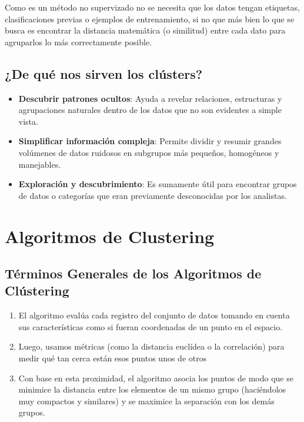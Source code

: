 Como es un método no supervizado no se necesita que los datos tengan
etiquetas, clasificaciones previas o ejemplos de entrenamiento, si no
que más bien lo que se busca es encontrar la distancia matemática (o
similitud) entre cada dato para agruparlos lo más correctamente posible.

\subsection{¿De qué nos sirven los clústers?}

\begin{itemize}
\item
  \textbf{Descubrir patrones ocultos}: Ayuda a revelar relaciones,
  estructuras y agrupaciones naturales dentro de los datos que no son
  evidentes a simple vista.
\item
  \textbf{Simplificar información compleja}: Permite dividir y resumir
  grandes volúmenes de datos ruidosos en subgrupos más pequeños,
  homogéneos y manejables.
\item
  \textbf{Exploración y descubrimiento}: Es sumamente útil para
  encontrar grupos de datos o categorías que eran previamente
  desconocidas por los analistas.
\end{itemize}

\section{Algoritmos de Clustering}

\subsection{Términos Generales de los Algoritmos de Clústering}

\begin{enumerate}
\item
  El algoritmo evalúa cada registro del conjunto de datos tomando en
  cuenta sus características como si fueran coordenadas de un punto en
  el espacio.
\item
  Luego, usamos métricas (como la distancia euclídea o la correlación)
  para medir qué tan cerca están esos puntos unos de otros
\item
  Con base en esta proximidad, el algoritmo asocia los puntos de modo
  que se minimice la distancia entre los elementos de un mismo grupo
  (haciéndolos muy compactos y similares) y se maximice la separación
  con los demás grupos.
\end{enumerate}

